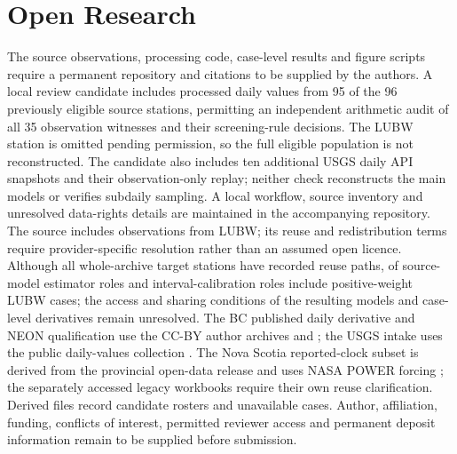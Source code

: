 \documentclass[draft,linenumbers]{agujournal2025}
\begin{document}
\section*{Open Research}
The source observations, processing code, case-level results and figure scripts require a permanent repository and citations to be supplied by the authors. A local review candidate includes processed daily values from 95 of the 96 previously eligible source stations, permitting an independent arithmetic audit of all 35 observation witnesses and their screening-rule decisions. The LUBW station is omitted pending permission, so the full eligible population is not reconstructed. The candidate also includes ten additional USGS daily API snapshots and their observation-only replay; neither check reconstructs the main models or verifies subdaily sampling. A local workflow, source inventory and unresolved data-rights details are maintained in the accompanying repository. The source includes observations from LUBW; its reuse and redistribution terms require provider-specific resolution rather than an assumed open licence. Although all whole-archive target stations have recorded reuse paths, \RightsEstimatorLUBW{} of \RightsModelCombinations{} source-model estimator roles and \RightsCalibrationLUBW{} interval-calibration roles include positive-weight LUBW cases; the access and sharing conditions of the resulting models and case-level derivatives remain unresolved. The BC published daily derivative and NEON qualification use the CC-BY author archives \cite{moore2024bc} and \cite{marzolf2025neon}; the USGS intake uses the public daily-values collection \cite{usgsogc2026}. The Nova Scotia reported-clock subset is derived from the provincial open-data release \cite{novascotiawater2026} and uses NASA POWER forcing \cite{nasapower2026}; the separately accessed legacy workbooks require their own reuse clarification. Derived files record candidate rosters and unavailable cases. Author, affiliation, funding, conflicts of interest, permitted reviewer access and permanent deposit information remain to be supplied before submission.



\end{document}
